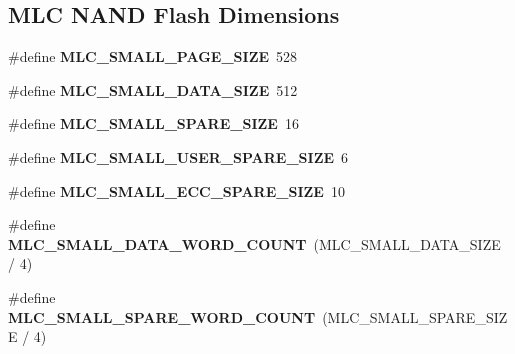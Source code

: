 \subsection*{M\+LC N\+A\+ND Flash Dimensions}
\begin{DoxyCompactItemize}
\item 
\mbox{\label{group__lpc32xx__nand__mlc_ga4675312b1b9f88d1fce59f1acced08ea}} 
\#define {\bfseries M\+L\+C\+\_\+\+S\+M\+A\+L\+L\+\_\+\+P\+A\+G\+E\+\_\+\+S\+I\+ZE}~528
\item 
\mbox{\label{group__lpc32xx__nand__mlc_ga2c9408d5baf571960ce266fca95532d7}} 
\#define {\bfseries M\+L\+C\+\_\+\+S\+M\+A\+L\+L\+\_\+\+D\+A\+T\+A\+\_\+\+S\+I\+ZE}~512
\item 
\mbox{\label{group__lpc32xx__nand__mlc_ga8a75cbd14fa3807cd5e08c65bec8e4f2}} 
\#define {\bfseries M\+L\+C\+\_\+\+S\+M\+A\+L\+L\+\_\+\+S\+P\+A\+R\+E\+\_\+\+S\+I\+ZE}~16
\item 
\mbox{\label{group__lpc32xx__nand__mlc_gacec74222c7aa48a2ce2d264a42592d7a}} 
\#define {\bfseries M\+L\+C\+\_\+\+S\+M\+A\+L\+L\+\_\+\+U\+S\+E\+R\+\_\+\+S\+P\+A\+R\+E\+\_\+\+S\+I\+ZE}~6
\item 
\mbox{\label{group__lpc32xx__nand__mlc_ga4312271e7f9d5905fa87fb6aacd3d0b1}} 
\#define {\bfseries M\+L\+C\+\_\+\+S\+M\+A\+L\+L\+\_\+\+E\+C\+C\+\_\+\+S\+P\+A\+R\+E\+\_\+\+S\+I\+ZE}~10
\item 
\mbox{\label{group__lpc32xx__nand__mlc_gab6995e133e146f52e2ea9ca63d6f0187}} 
\#define {\bfseries M\+L\+C\+\_\+\+S\+M\+A\+L\+L\+\_\+\+D\+A\+T\+A\+\_\+\+W\+O\+R\+D\+\_\+\+C\+O\+U\+NT}~(M\+L\+C\+\_\+\+S\+M\+A\+L\+L\+\_\+\+D\+A\+T\+A\+\_\+\+S\+I\+ZE / 4)
\item 
\mbox{\label{group__lpc32xx__nand__mlc_gadfbc9bf0f148533c13f489622cb76129}} 
\#define {\bfseries M\+L\+C\+\_\+\+S\+M\+A\+L\+L\+\_\+\+S\+P\+A\+R\+E\+\_\+\+W\+O\+R\+D\+\_\+\+C\+O\+U\+NT}~(M\+L\+C\+\_\+\+S\+M\+A\+L\+L\+\_\+\+S\+P\+A\+R\+E\+\_\+\+S\+I\+ZE / 4)
\item 
\mbox{\label{group__lpc32xx__nand__mlc_gaf311f4f240bc79727aa2108861ec1b25}} 

\end{DoxyCompactItemize}
